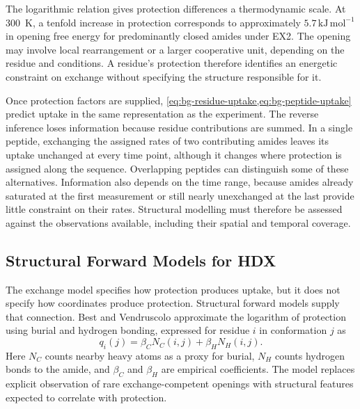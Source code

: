 The logarithmic relation gives protection differences a thermodynamic scale. At 300~K, a tenfold increase in protection corresponds to approximately $5.7\,\mathrm{kJ\,mol^{-1}}$ in opening free energy for predominantly closed amides under EX2. The opening may involve local rearrangement or a larger cooperative unit, depending on the residue and conditions.\supercite{englanderHydrogenExchangeModern1997} A residue's protection therefore identifies an energetic constraint on exchange without specifying the structure responsible for it.

Once protection factors are supplied, \cref{eq:bg-residue-uptake,eq:bg-peptide-uptake} predict uptake in the same representation as the experiment. The reverse inference loses information because residue contributions are summed. In a single peptide, exchanging the assigned rates of two contributing amides leaves its uptake unchanged at every time point, although it changes where protection is assigned along the sequence. Overlapping peptides can distinguish some of these alternatives.\supercite{skinnerEstimatingConstraintsProtection2019} Information also depends on the time range, because amides already saturated at the first measurement or still nearly unexchanged at the last provide little constraint on their rates. Structural modelling must therefore be assessed against the observations available, including their spatial and temporal coverage.

\subsection{Structural Forward Models for HDX}
\label{sec:bg-hdx-forward-models}

The exchange model specifies how protection produces uptake, but it does not specify how coordinates produce protection. Structural forward models supply that connection. Best and Vendruscolo approximate the logarithm of protection using burial and hydrogen bonding, expressed for residue $i$ in conformation $j$ as
\begin{equation}
    q_i(j)=\beta_C N_C(i,j)+\beta_H N_H(i,j).
    \label{eq:bg-bv-feature}
\end{equation}
Here $N_C$ counts nearby heavy atoms as a proxy for burial, $N_H$ counts hydrogen bonds to the amide, and $\beta_C$ and $\beta_H$ are empirical coefficients.\supercite{bestStructuralInterpretationHydrogen2006} The model replaces explicit observation of rare exchange-competent openings with structural features expected to correlate with protection.

